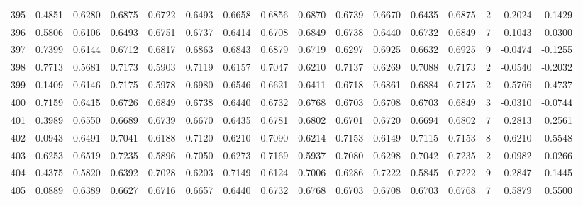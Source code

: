 \begin{tabular}{lrrrrrrrrrrrrrrr}
395 &      0.4851 &  0.6280 &  0.6875 &  0.6722 &  0.6493 &  0.6658 &  0.6856 &  0.6870 &  0.6739 &  0.6670 &   0.6435 &     0.6875 &      2 &                    0.2024 &                     0.1429 \\
396 &      0.5806 &  0.6106 &  0.6493 &  0.6751 &  0.6737 &  0.6414 &  0.6708 &  0.6849 &  0.6738 &  0.6440 &   0.6732 &     0.6849 &      7 &                    0.1043 &                     0.0300 \\
397 &      0.7399 &  0.6144 &  0.6712 &  0.6817 &  0.6863 &  0.6843 &  0.6879 &  0.6719 &  0.6297 &  0.6925 &   0.6632 &     0.6925 &      9 &                   -0.0474 &                    -0.1255 \\
398 &      0.7713 &  0.5681 &  0.7173 &  0.5903 &  0.7119 &  0.6157 &  0.7047 &  0.6210 &  0.7137 &  0.6269 &   0.7088 &     0.7173 &      2 &                   -0.0540 &                    -0.2032 \\
399 &      0.1409 &  0.6146 &  0.7175 &  0.5978 &  0.6980 &  0.6546 &  0.6621 &  0.6411 &  0.6718 &  0.6861 &   0.6884 &     0.7175 &      2 &                    0.5766 &                     0.4737 \\
400 &      0.7159 &  0.6415 &  0.6726 &  0.6849 &  0.6738 &  0.6440 &  0.6732 &  0.6768 &  0.6703 &  0.6708 &   0.6703 &     0.6849 &      3 &                   -0.0310 &                    -0.0744 \\
401 &      0.3989 &  0.6550 &  0.6689 &  0.6739 &  0.6670 &  0.6435 &  0.6781 &  0.6802 &  0.6701 &  0.6720 &   0.6694 &     0.6802 &      7 &                    0.2813 &                     0.2561 \\
402 &      0.0943 &  0.6491 &  0.7041 &  0.6188 &  0.7120 &  0.6210 &  0.7090 &  0.6214 &  0.7153 &  0.6149 &   0.7115 &     0.7153 &      8 &                    0.6210 &                     0.5548 \\
403 &      0.6253 &  0.6519 &  0.7235 &  0.5896 &  0.7050 &  0.6273 &  0.7169 &  0.5937 &  0.7080 &  0.6298 &   0.7042 &     0.7235 &      2 &                    0.0982 &                     0.0266 \\
404 &      0.4375 &  0.5820 &  0.6392 &  0.7028 &  0.6203 &  0.7149 &  0.6124 &  0.7006 &  0.6286 &  0.7222 &   0.5845 &     0.7222 &      9 &                    0.2847 &                     0.1445 \\
405 &      0.0889 &  0.6389 &  0.6627 &  0.6716 &  0.6657 &  0.6440 &  0.6732 &  0.6768 &  0.6703 &  0.6708 &   0.6703 &     0.6768 &      7 &                    0.5879 &                     0.5500 \\

\end{tabular}
